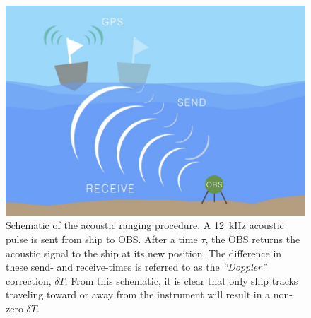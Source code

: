 \documentclass[10pt,titlepage]{article}
\begin{document}
\newpage
\begin{figure}
[h]
\includegraphics[trim=0cm 0cm 0cm 0cm,clip=true,width=\columnwidth]{OBS_Illustration.jpg}
\caption{Schematic of the acoustic ranging procedure. A 12~kHz acoustic pulse is sent from ship to OBS. After a time $\tau$, the OBS returns the acoustic signal to the ship at its new position. The difference in these send- and receive-times is referred to as the \textit{``Doppler''} correction, $\delta T$. From this schematic, it is clear that only ship tracks traveling toward or away from the instrument will result in a non-zero $\delta T$.}
\label{fig:cartoon}
\end{figure}
\newpage
\end{document}
